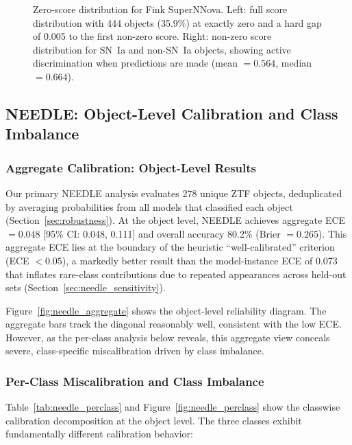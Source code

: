 \documentclass[twocolumn]{aastex631}
\begin{document}
\begin{figure}
\caption{Zero-score distribution for Fink SuperNNova. Left: full score distribution with 444 objects (35.9\%) at exactly zero and a hard gap of 0.005 to the first non-zero score. Right: non-zero score distribution for SN~Ia and non-SN~Ia objects, showing active discrimination when predictions are made (mean $= 0.564$, median $= 0.664$). \label{fig:fink_snn_hist}}
\end{figure}


\subsection{NEEDLE: Object-Level Calibration and Class Imbalance}\label{sec:needle}

\subsubsection{Aggregate Calibration: Object-Level Results}

Our primary NEEDLE analysis evaluates 278 unique ZTF objects, deduplicated by averaging probabilities from all models that classified each object (Section~\ref{sec:robustness}). At the object level, NEEDLE achieves aggregate ECE $= 0.048$ [95\% CI: 0.048, 0.111] and overall accuracy 80.2\% (Brier $= 0.265$). This aggregate ECE lies at the boundary of the heuristic ``well-calibrated'' criterion (ECE $< 0.05$), a markedly better result than the model-instance ECE of 0.073 that inflates rare-class contributions due to repeated appearances across held-out sets (Section~\ref{sec:needle_sensitivity}).

Figure~\ref{fig:needle_aggregate} shows the object-level reliability diagram. The aggregate bars track the diagonal reasonably well, consistent with the low ECE. However, as the per-class analysis below reveals, this aggregate view conceals severe, class-specific miscalibration driven by class imbalance.

\subsubsection{Per-Class Miscalibration and Class Imbalance}\label{sec:needle_perclass}

Table~\ref{tab:needle_perclass} and Figure~\ref{fig:needle_perclass} show the classwise calibration decomposition at the object level. The three classes exhibit fundamentally different calibration behavior:
\end{document}
